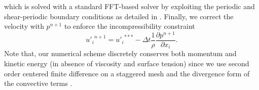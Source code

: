 which is solved with a standard FFT-based solver by exploiting the periodic and shear-periodic boundary conditions as detailed in \cite{tanaka_2017a}. Finally, we correct the velocity with $p^{n+1}$ to enforce the incompressibility constraint
\begin{equation}
\label{eq:correcSplit}
{u'_i}^{n+1} = {u'_i}^{***} - \Delta t \frac{1}{\rho} \frac{\partial p^{n+1}}{\partial x_i}.
\end{equation}
Note that, our numerical scheme discretely conserves both momentum and kinetic energy (in absence of viscosity and surface tension) since we use second order centered finite difference on a staggered mesh and the divergence form of the convective terms \citep{morinishi_lund_vasilyev_moin_1998a}.

